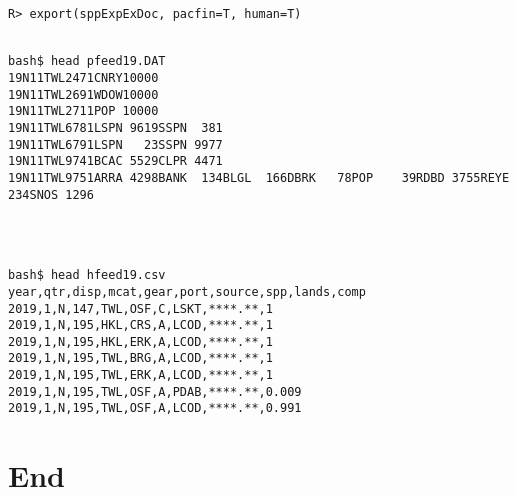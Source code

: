 \documentclass[ xcolor = pdftex, dvipsnames, table ]{beamer}
\begin{document}
%
\begin{frame}[fragile]
\begin{minipage}[h!]{0.34\textwidth}
\vspace{-0.1cm}
{\scriptsize
\begin{verbatim}
R> export(sppExpExDoc, pacfin=T, human=T)
\end{verbatim}
}
\end{minipage}
\begin{minipage}[h!]{0.64\textwidth}
{\scriptsize
\begin{verbatim}

bash$ head pfeed19.DAT
19N11TWL2471CNRY10000
19N11TWL2691WDOW10000
19N11TWL2711POP 10000
19N11TWL6781LSPN 9619SSPN  381
19N11TWL6791LSPN   23SSPN 9977
19N11TWL9741BCAC 5529CLPR 4471
19N11TWL9751ARRA 4298BANK  134BLGL  166DBRK   78POP    39RDBD 3755REYE  234SNOS 1296
\end{verbatim}

\begin{verbatim}



bash$ head hfeed19.csv 
year,qtr,disp,mcat,gear,port,source,spp,lands,comp
2019,1,N,147,TWL,OSF,C,LSKT,****.**,1
2019,1,N,195,HKL,CRS,A,LCOD,****.**,1
2019,1,N,195,HKL,ERK,A,LCOD,****.**,1
2019,1,N,195,TWL,BRG,A,LCOD,****.**,1
2019,1,N,195,TWL,ERK,A,LCOD,****.**,1
2019,1,N,195,TWL,OSF,A,PDAB,****.**,0.009
2019,1,N,195,TWL,OSF,A,LCOD,****.**,0.991
\end{verbatim}
}
\end{minipage}
\end{frame}

%
\section{End}
\subsection{}

%
\begin{frame}
\end{frame}
\end{document}
